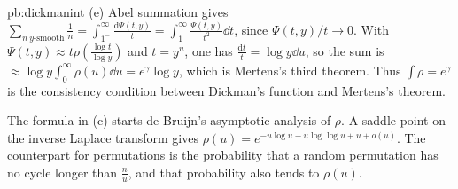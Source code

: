 \begin{solution}{pb:dickmanint}
(e) Abel summation gives $\sum_{n\ y\text{-smooth}}\frac1n=\int_{1^-}^\infty\frac{\mathrm d\Psi(t,y)}t=\int_1^\infty\frac{\Psi(t,y)}{t^2}\dd t$, since $\Psi(t,y)/t\to0$. With $\Psi(t,y)\approx t\rho(\frac{\log t}{\log y})$ and
$t=y^u$, one has $\frac{\mathrm dt}t=\log y\dd u$, so the sum is $\approx\log y\int_0^\infty\rho(u)\dd u=e^\gamma\log y$, which is Mertens's third theorem. Thus $\int\rho=e^\gamma$ is the
consistency condition between Dickman's function and Mertens's theorem.

\leads The formula in (c) starts de Bruijn's asymptotic analysis of $\rho$. A saddle point on the inverse Laplace transform gives $\rho(u)=e^{-u\log u-u\log\log u+u+o(u)}$.
The counterpart for permutations is the probability that a random permutation has no cycle longer than $\frac nu$, and that probability also tends to $\rho(u)$.
\end{solution}

